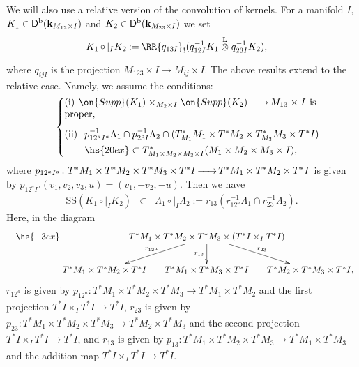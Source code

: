 \documentclass[12pt,leqno]{article}
\theoremstyle{definition}
\newcommand{\cor}{{\bf k}}
\renewcommand{\to}[1][]{\xrightarrow[]{#1}}
\newcommand{\To}{\mathop{\makebox[2em]{\rightarrowfill}}}
\newcommand{\ltens}[1][]{\mathbin{\overset{\mathrm{L}}\otimes}_{#1}}
\newcommand{\conv}[1][]{\mathop{\circ}\limits_{#1}}
\newcommand{\reim}[1]{\RR{#1}_!}
\newcommand{\opb}[1]{#1^{-1}}
\newcommand{\eqdot}{\mathbin{:=}}
\newcommand{\seteq}{\mathbin{:=}}
\newcommand{\cl}{\colon}
\newcommand{\ba}{\begin{array}}
\newcommand{\ea}{\end{array}}
\newcommand{\eq}{\begin{eqnarray}}
\newcommand{\eneq}{\end{eqnarray}}
\newcommand{\eqn}{\begin{eqnarray*}}
\newcommand{\eneqn}{\end{eqnarray*}}
\newcommand{\Supp}{\on{Supp}}
\newcommand{\Der}[1][]{\mathsf{D}^{#1}}
\newcommand{\Derb}{\Der[\mathrm{b}]}
\newcommand{\SSi}{\mathrm{SS}}
\numberwithin{equation}{section}
\begin{document}
We will also use a relative version of the convolution of kernels.  
For a manifold $I$, $K_1 \in \Derb(\cor_{M_{12}\times I})$ and 
$K_2 \in\Derb(\cor_{M_{23}\times I})$ we set
\eq
\label{eq:rel_conv}
&K_1\conv|_I K_2\eqdot
\reim{q_{13I}}(\opb{q_{12I}}K_1\ltens\opb{q_{23I}}K_2),
\eneq
where $q_{ijI}$ is the projection $M_{123}\times I \to M_{ij}\times I$.
The above results extend to the relative case. Namely, we assume
the conditions:
\eq\label{eq:noncharkerrel}
&&\left\{
\parbox{60ex}{
(i) $\Supp(K_1)\times_{M_2\times I}\Supp(K_2)\To M_{13}\times I$ is proper,
\\[2ex]
(ii) 
$\ba[t]{l}
\opb{p_{12^aI^a}}\Lambda_1\cap\opb{p_{23I}}\Lambda_2
\cap (T^*_{M_1}M_1\times T^*M_2\times T^*_{M_3}M_3\times T^*I)\\[1ex]
\hs{20ex} \subset T^*_{M_1\times M_2\times M_3\times I}(M_1\times M_2\times M_3\times I),
\ea$
}\right.
\eneq
where 
$p_{12^aI^a}\cl T^*M_1\times T^*M_2\times T^*M_3\times T^*I\To T^*M_1\times T^*M_2\times T^*I$ 
is given by $p_{12^aI^a}(v_1,v_2,v_3,u)=(v_1,-v_2,-u)$.
Then we  have
\eq\label{eq:est_rel}
\SSi(K_1\conv|_IK_2)&\subset &
\Lambda_1\conv |_I\Lambda_2\seteq r_{13}
(r_{12^a}^{-1}\Lambda_1\cap r_{23}^{-1}\Lambda_2).
\eneq
Here, in the diagram
\eqn
&&\hs{-3ex}\xymatrix@C=-6ex@R=5ex{
&{T^*M_1\times T^*M_2\times T^*M_3\times (T^*I\times_IT^*I)}
\ar[dl]_-{r_{12^a}}\ar[d]_-{r_{13}}\ar[dr]^-{r_{23}}\\
{T^*M_1\times T^*M_2\times T^*I}&
{T^*M_1\times T^*M_3\times T^*I}&
{T^*M_2\times T^*M_3\times T^*I},
}
\eneqn
$r_{12^a}$ is given by
$p_{12^a}\cl 
T^*M_1\times T^*M_2\times T^*M_3\to T^*M_1\times T^*M_2$
and the first projection $T^*I\times_IT^*I\to T^*I$,
$r_{23}$ is given by
$p_{23}\cl 
T^*M_1\times T^*M_2\times T^*M_3\to T^*M_2\times T^*M_3$
and the second projection $T^*I\times_IT^*I\to T^*I$,
and $r_{13}$ is given by
$p_{13}\cl 
T^*M_1\times T^*M_2\times T^*M_3\to T^*M_1\times T^*M_3$
and the addition map $T^*I\times_IT^*I\to T^*I$.
\end{document}
